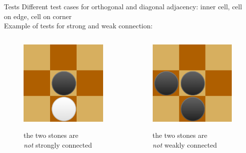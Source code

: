 \documentclass{beamer}
\begin{document}
\begin{frame}{Tests}
	Different test cases for orthogonal and diagonal adjacency: inner cell, cell on edge, cell on corner\\  %
	\vspace{0.8cm}
	Example of tests for strong and weak connection: 
	\begin{columns}
		\begin{figure}
			\includegraphics[scale=0.15]{images/test-strong-connection.png}
			
			the two stones are \\\textit{not} strongly connected
		\end{figure}
		
		\begin{figure}
			\includegraphics[scale=0.15]{images/test-weak-connection.png}
			
			the two stones are \\\textit{not} weakly connected
		\end{figure}
	\end{columns}
\end{frame}
\end{document}
